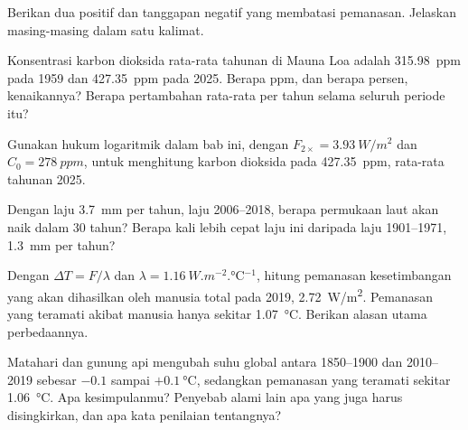 \begin{exercise}[$\star$]\label{exo:g12:climate-change:5}
Berikan dua  positif dan tanggapan negatif yang membatasi
pemanasan. Jelaskan masing-masing dalam satu kalimat.
\end{exercise}

\begin{exercise}[$\star\star$]\label{exo:g12:climate-change:6}
Konsentrasi karbon dioksida rata-rata tahunan di Mauna Loa adalah
\qty{315.98}{ppm} pada 1959 dan \qty{427.35}{ppm} pada 2025. Berapa ppm, dan
berapa persen, kenaikannya? Berapa pertambahan rata-rata per tahun selama
seluruh periode itu?
\end{exercise}

\begin{exercise}[$\star\star$]\label{exo:g12:climate-change:7}
Gunakan hukum logaritmik dalam bab ini, dengan $F_{2\times} =
\qty{3.93}{W/m^2}$ dan $C_0 = \qty{278}{ppm}$, untuk menghitung  karbon
dioksida pada \qty{427.35}{ppm}, rata-rata tahunan 2025.
\end{exercise}

\begin{exercise}[$\star\star$]\label{exo:g12:climate-change:8}
Dengan laju \qty{3.7}{mm} per tahun, laju 2006--2018, berapa permukaan laut
akan naik dalam 30 tahun? Berapa kali lebih cepat laju ini daripada laju
1901--1971, \qty{1.3}{mm} per tahun?
\end{exercise}

\begin{exercise}[$\star\star$]\label{exo:g12:climate-change:9}
Dengan $\Delta T = F/\lambda$ dan $\lambda = \qty{1.16}{W.m^{-2}.\degreeCelsius^{-1}}$,
hitung pemanasan kesetimbangan yang akan dihasilkan oleh  manusia total
pada 2019, \qty{2.72}{W/m^2}. Pemanasan yang teramati akibat manusia hanya
sekitar \qty{1.07}{\degreeCelsius}. Berikan alasan utama perbedaannya.
\end{exercise}

\begin{exercise}[$\star\star$]\label{exo:g12:climate-change:10}
Matahari dan gunung api mengubah suhu global antara 1850--1900 dan
2010--2019 sebesar $-0.1$ sampai $+\qty{0.1}{\degreeCelsius}$, sedangkan
pemanasan yang teramati sekitar \qty{1.06}{\degreeCelsius}. Apa kesimpulanmu?
Penyebab alami lain apa yang juga harus disingkirkan, dan apa kata penilaian
tentangnya?
\end{exercise}

